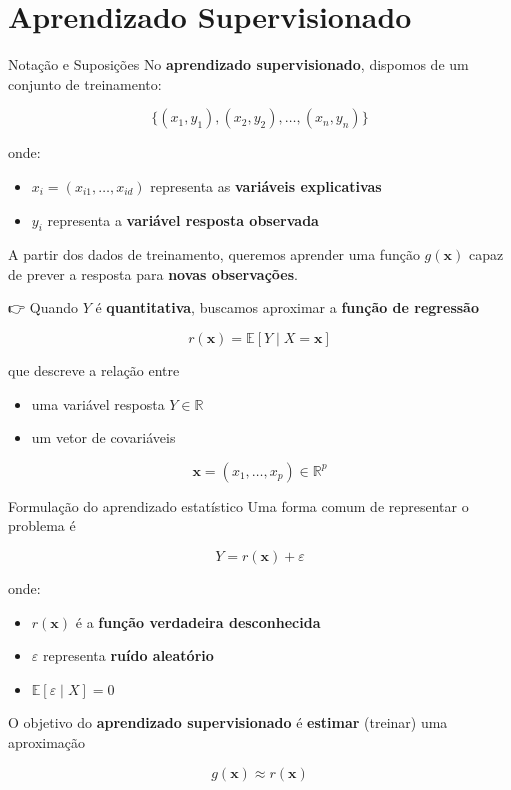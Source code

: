 \documentclass[
  ignorenonframetext,
  aspectratio=169,
]{beamer}
\providecommand{\tightlist}{%
  \setlength{\itemsep}{0pt}\setlength{\parskip}{0pt}}
\begin{document}
\section{Aprendizado Supervisionado}\label{aprendizado-supervisionado-1}

\begin{frame}{Notação e Suposições}
\label{notauxe7uxe3o-e-suposiuxe7uxf5es}
No \textbf{aprendizado supervisionado}, dispomos de um conjunto de
treinamento:

\[
\{(x_1, y_1), (x_2, y_2), \ldots, (x_n, y_n)\}
\]

onde:

\begin{itemize}
\tightlist
\item
  \(x_i = (x_{i1}, \ldots, x_{id})\) representa as \textbf{variáveis
  explicativas}
\item
  \(y_i\) representa a \textbf{variável resposta observada}
\end{itemize}
\end{frame}

\begin{frame}
A partir dos dados de treinamento, queremos aprender uma função
\(g(\mathbf{x})\) capaz de prever a resposta para \textbf{novas
observações}.

\pause

👉 Quando \(Y\) é \textbf{quantitativa}, buscamos aproximar a
\textbf{função de regressão}

\[
r(\mathbf{x}) = \mathbb{E}[Y \mid X = \mathbf{x}]
\]

que descreve a relação entre

\begin{itemize}
\tightlist
\item
  uma variável resposta \(Y \in \mathbb{R}\)
\item
  um vetor de covariáveis
\end{itemize}

\[
\mathbf{x} = (x_1,\ldots,x_p) \in \mathbb{R}^p
\]
\end{frame}

\begin{frame}{Formulação do aprendizado estatístico}
\label{formulauxe7uxe3o-do-aprendizado-estatuxedstico}
Uma forma comum de representar o problema é

\[
Y = r(\mathbf{x}) + \varepsilon
\]

onde:

\begin{itemize}
\tightlist
\item
  \(r(\mathbf{x})\) é a \textbf{função verdadeira desconhecida}
\item
  \(\varepsilon\) representa \textbf{ruído aleatório}
\item
  \(\mathbb{E}[\varepsilon \mid X] = 0\)
\end{itemize}

O objetivo do \textbf{aprendizado supervisionado} é \textbf{estimar}
(treinar) uma aproximação

\[
g(\mathbf{x}) \approx r(\mathbf{x})
\]
\end{frame}
\end{document}
